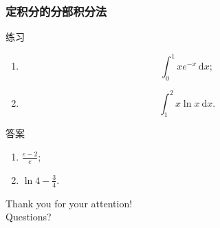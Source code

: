 \documentclass[
10pt,
aspectratio=43,
]{beamer}
\begin{document}
\begin{frame}
	\frametitle{定积分的分部积分法}
	\everymath{\displaystyle}
	\begin{block}{练习}
		\begin{enumerate}
			\item
			      $$
				      \int_0^1 x e^{-x}  \mathrm{~d} x;
			      $$
			\item
			      $$
				      \int_1^2 x \ln x \mathrm{~d} x.
			      $$
		\end{enumerate}
	\end{block}
	\pause
	\begin{exampleblock}{答案}
		\begin{enumerate}[<+->]
			\item $\frac{e-2}{e}$;\vspace{0.5cm}
			\item $\ln 4-\frac{3}{4}$.
		\end{enumerate}
	\end{exampleblock}
\end{frame}

\begin{frame}[plain]
	\vfill
	\centering
	{
		\centering \Huge \color{white} Thank you for your attention!\\[10pt]Questions?
	}
	\vfill
\end{frame}
\end{document}

